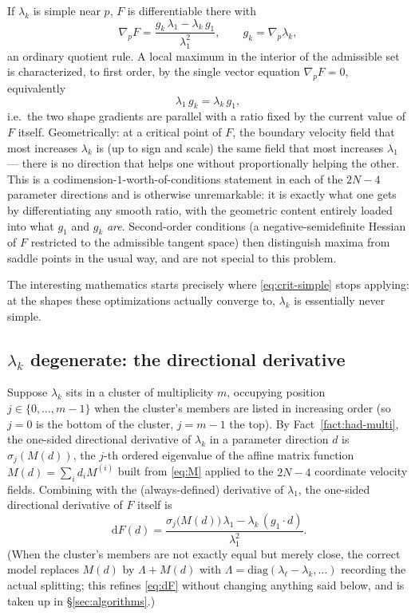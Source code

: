 \documentclass[11pt]{article}
\newcommand{\dd}{\,\mathrm{d}}
\theoremstyle{plain}
\begin{document}
If $\lambda_k$ is simple near $p$, $F$ is differentiable there with
\begin{equation}\label{eq:gradF}
  \nabla_p F=\frac{g_k\,\lambda_1-\lambda_k\,g_1}{\lambda_1^2},\qquad g_k=\nabla_p\lambda_k,
\end{equation}
an ordinary quotient rule. A local maximum in the interior of the admissible set is characterized,
to first order, by the single vector equation $\nabla_p F=0$, equivalently
\begin{equation}\label{eq:crit-simple}
  \lambda_1\,g_k=\lambda_k\,g_1 ,
\end{equation}
i.e.\ the two shape gradients are parallel with a ratio fixed by the current value of $F$ itself.
Geometrically: at a critical point of $F$, the boundary velocity field that most increases
$\lambda_k$ is (up to sign and scale) the same field that most increases $\lambda_1$ --- there is
no direction that helps one without proportionally helping the other. This is a codimension-$1$-worth-of-conditions
statement in each of the $2N-4$ parameter directions and is otherwise unremarkable: it is exactly
what one gets by differentiating any smooth ratio, with the geometric content entirely loaded into
what $g_1$ and $g_k$ \emph{are}. Second-order conditions (a negative-semidefinite Hessian of $F$
restricted to the admissible tangent space) then distinguish maxima from saddle points in the
usual way, and are not special to this problem.

The interesting mathematics starts precisely where \eqref{eq:crit-simple} stops applying: at the
shapes these optimizations actually converge to, $\lambda_k$ is essentially never simple.

\subsection{$\lambda_k$ degenerate: the directional derivative}\label{sec:degen-general}

Suppose $\lambda_k$ sits in a cluster of multiplicity $m$, occupying position $j\in\{0,\dots,m-1\}$
when the cluster's members are listed in increasing order (so $j=0$ is the bottom of the cluster,
$j=m-1$ the top). By Fact~\ref{fact:had-multi}, the one-sided directional derivative of
$\lambda_k$ in a parameter direction $d$ is $\sigma_j(M(d))$, the $j$-th ordered eigenvalue of the
affine matrix function $M(d)=\sum_i d_i M^{(i)}$ built from \eqref{eq:M} applied to the $2N-4$
coordinate velocity fields. Combining with the (always-defined) derivative of $\lambda_1$, the
one-sided directional derivative of $F$ itself is
\begin{equation}\label{eq:dF}
  \dd F(d)=\frac{\sigma_j\big(M(d)\big)\,\lambda_1-\lambda_k\,(g_1\cdot d)}{\lambda_1^2}.
\end{equation}
(When the cluster's members are not exactly equal but merely close, the correct model replaces
$M(d)$ by $\Lambda+M(d)$ with $\Lambda=\mathrm{diag}(\lambda_\ell-\lambda_k,\dots)$ recording the
actual splitting; this refines \eqref{eq:dF} without changing anything said below, and is taken up
in \S\ref{sec:algorithms}.)
\end{document}
